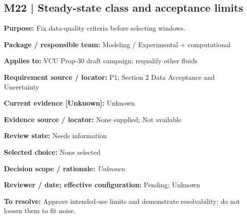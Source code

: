 \documentclass[11pt]{article}
\begin{document}
\par\noindent\begin{minipage}{\textwidth}\small\setlength{\parskip}{2pt}
\subsection*{M22 | Steady-state class and acceptance limits}
\textbf{Purpose:} Fix data-quality criteria before selecting windows.\par
\textbf{Package / responsible team:} Modeling / Experimental + computational\par
\textbf{Applies to:} VCU Prop-30 draft campaign; requalify other fluids\par
\textbf{Requirement source / locator:} P1; Section 2 Data Acceptance and Uncertainty\par
\textbf{Current evidence [Unknown]:} Unknown\par
\textbf{Evidence source / locator:} None supplied; Not available\par
\textbf{Review state:} Needs information\par
\textbf{Selected choice:} None selected\par
\textbf{Decision scope / rationale:} \textit{Unknown}\par
\textbf{Reviewer / date; effective configuration:} Pending; Unknown\par
\textbf{To resolve:} Approve intended-use limits and demonstrate resolvability; do not loosen them to fit noise.\par
\end{minipage}\par\vspace{5pt}
\end{document}
